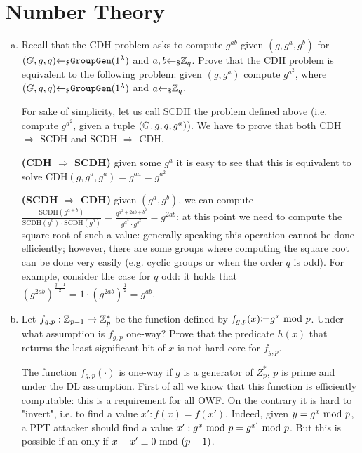 \section{Number Theory}
\begin{enumerate}[(a)]
	\item Recall that the CDH problem asks to compute $g^{ab}$ given $(g, g^a, g^b)$ for $(G, g, q) {\leftarrow_\$} \texttt{GroupGen}(1^\lambda)$ and $a, b {\leftarrow_\$} {\mathbb Z}_q$. Prove that the CDH problem is equivalent to the following problem: given $(g, g^a)$ compute $g^{a^2}$, where $(G, g, q) {\leftarrow_\$} \texttt{GroupGen}(1^\lambda)$ and $a {\leftarrow_\$} {\mathbb Z}_q$.
	
	\begin{solution}
		For sake of simplicity, let us call SCDH the problem defined above (i.e. compute $g^{a^2}$, given a tuple $({\mathbb G}, g, q, g^a)$). We have to prove that both CDH $\Rightarrow$ SCDH and SCDH $\Rightarrow$ CDH.

		\bigskip
		\textbf{(CDH $\Rightarrow$ SCDH)} given some $g^a$ it is easy to see that this is equivalent to solve CDH$(g, g^a, g^a) = g^{aa} = g^{a^2}$
		
		\bigskip
		\textbf{(SCDH $\Rightarrow$ CDH)} given $(g^a, g^b)$, we can compute $\frac{\mbox{SCDH}(g^{a+b})}{\mbox{SCDH}(g^a) \cdot \mbox{SCDH}(g^b)} = \frac{g^{a^2+2ab + b^2}}{g^{a^2} \cdot g^{b^2}} = g^{2ab}$: at this point we need to compute the square root of such a value: generally speaking this operation cannot be done efficiently; however, there are some groups where computing the square root can be done very easily (e.g. cyclic groups or when the order $q$ is odd). For example, consider the case for $q$ odd: it holds that $(g^{2ab})^{\frac{q + 1}{2}} = 1 \cdot (g^{2ab})^{\frac{1}{2}} = g^{ab}$.
		 
	\end{solution}
	
	\item Let $f_{g,p}: {\mathbb Z}_{p-1} \to {\mathbb Z}^*_p$ be the function defined by $f_{g,p}(x) {\coloneqq} g^x \mbox{ mod } p$. Under what assumption is $f_{g,p}$ one-way? Prove that the predicate $h(x)$ that returns the least significant bit of $x$ is not hard-core for $f_{g,p}$.

	\begin{solution}
		The function $f_{g,p}(\cdot)$ is one-way if $g$ is a generator of $Z_p^*$, $p$ is prime and under the DL assumption. First of all we know that this function is efficiently computable: this is a requirement for all OWF. On the contrary it is hard to "invert", i.e. to find a value $x': f(x) = f(x')$. Indeed, given $y = g^x \mbox{ mod } p$, a PPT attacker should find a value $x': g^x \mbox{ mod } p = g^{x'} \mbox{ mod } p$. But this is possible if an only if $x - x' \equiv 0 \mbox{ mod } (p-1)$.


\end{solution}
\end{enumerate}
